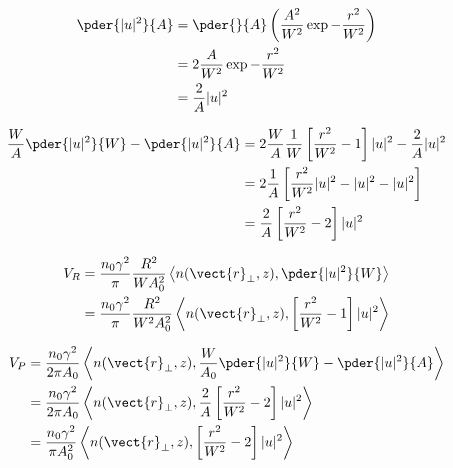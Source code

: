 \begin{equation}
\begin{split}
  \pder{|u|^2}{A} &= \pder{}{A}\left(\frac{A^2}{W^2}\exp{-\frac{r^2}{W^2}}\right)\\
  &= 2\frac{A}{W^2} \exp{-\frac{r^2}{W^2}} \\
  &= \frac{2}{A} |u|^2
\end{split}
\end{equation}

\begin{equation}
\begin{split}
  \frac{W}{ A } \pder{|u|^2}{W}  - \pder{|u|^2}{A} &= 2\frac{W}{ A }  \frac{1}{W}\left[\frac{r^2 }{W^2} - 1\right] |u|^2 - \frac{2}{A} |u|^2\\
  &= 2\frac{1}{ A }  \left[\frac{r^2 }{W^2}|u|^2 - |u|^2 - |u|^2 \right]\\
  &= \frac{2}{A} \left[\frac{r^2 }{W^2} - 2  \right]|u|^2
\end{split}
\end{equation}

\begin{equation}
\begin{split}
      V_{R} &= \frac{n_0 \gamma^2 }{\pi} \frac{R^2}{W A_0^2 } \left< n(\vect{r}_{\perp},z),\pder{|u|^2}{W}  \right> \\
      &= \frac{n_0 \gamma^2 }{\pi} \frac{R^2}{W^2 A_0^2 } \left< n(\vect{r}_{\perp},z),\left[\frac{r^2 }{W^2} - 1\right] |u|^2 \right>
\end{split}
\end{equation}


 
 
\begin{equation}
\begin{split}
      V_{P} &=  \frac{n_0 \gamma^2}{2\pi A_0} \left< n(\vect{r}_{\perp},z),\frac{W}{ A_0 } \pder{|u|^2}{W}  - \pder{|u|^2}{A}\right> \\
      &=\frac{n_0 \gamma^2}{2\pi A_0} \left< n(\vect{r}_{\perp},z),\frac{2}{A} \left[\frac{r^2 }{W^2} - 2  \right]|u|^2\right> \\
      &=\frac{n_0 \gamma^2}{\pi A_0^2} \left< n(\vect{r}_{\perp},z), \left[\frac{r^2 }{W^2} - 2  \right]|u|^2\right> \\
\end{split}
\end{equation}


